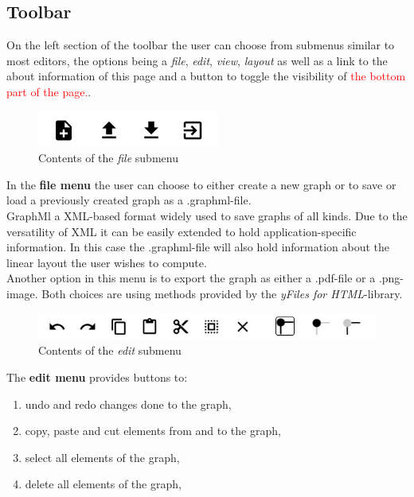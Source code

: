 \subsection{Toolbar}
On the left section of the toolbar the user can choose from submenus similar to most editors, the options being a \textit{file}, \textit{edit}, \textit{view}, \textit{layout} as well as a link to the about information of this page and a button to toggle the visibility of \textcolor{red}{the bottom part of the page.}.\\
\begin{figure}[!h]
\begin{center}
\includegraphics[scale=0.5]{figures/figIndex/FileToolbar.jpg}
\caption{Contents of the \textit{file} submenu}
\label{img:fileToolbar}
\end{center}
\end{figure}
In the \textbf{file menu} the user can choose to either create a new graph or to save or load a previously created graph as a .graphml-file. \\
GraphMl a XML-based format widely used to save graphs of all kinds. Due to the versatility of XML it can be easily extended to hold application-specific information. In this case the .graphml-file will also hold information about the linear layout the user wishes to compute.\\
Another option in this menu is to export the graph as either a .pdf-file or a .png-image. Both choices are using methods provided by the \textit{yFiles for HTML}-library.\\
\begin{figure}[!h]
\begin{center}
\includegraphics[scale=0.5]{figures/figIndex/EditToolbar.jpg}
\caption{Contents of the \textit{edit} submenu}
\label{img:edittoolbar}
\end{center}
\end{figure}
The \textbf{edit menu} provides buttons to:
\begin{enumerate}
\setlength{\parskip}{0pt} 
\item undo and redo changes done to the graph,
\item copy, paste and cut elements from and to the graph,
\item select all elements of the graph,
\item delete all elements of the graph,
\end{enumerate}
